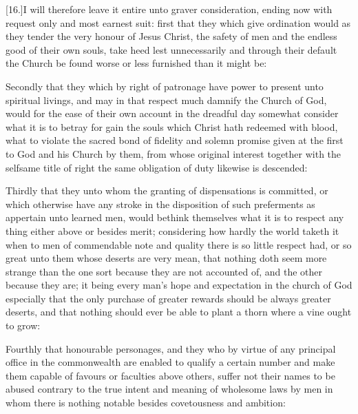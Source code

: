 [16.]I will therefore leave it entire unto graver consideration, ending now with request only and most earnest suit: first that they which give ordination would as they tender the very honour of Jesus Christ, the safety of men and the endless good of their own souls, take heed lest unnecessarily and through their default the Church be found worse or less furnished than it might be:

Secondly that they which by right of patronage have power to present unto spiritual livings, and may in that respect much damnify the Church of God, would for the ease of their own account in the dreadful day somewhat consider what it is to betray for gain the souls which Christ hath redeemed with blood, what to violate the sacred bond of fidelity and solemn promise given at the first to God and his Church by them, from whose original interest together with the selfsame title of right the same obligation of duty likewise is descended:

Thirdly that they unto whom the granting of dispensations is committed, or which otherwise have any stroke in the disposition of such preferments as appertain unto learned men, would bethink themselves what it is to respect any thing either above or besides merit; considering how hardly the world taketh it when to men of commendable note and quality there is so little respect had, or so great unto them whose deserts are very mean, that nothing doth seem more strange than the one sort because they are not accounted of, and the other because they are; it being every man’s hope and expectation in the church of God especially that the only purchase of greater rewards should be always greater deserts, and that nothing should ever be able to plant a thorn where a vine ought to grow:

Fourthly that honourable personages, and they who by virtue of any principal office in the commonwealth are enabled to qualify a certain number and make them capable of favours  or faculties above others, suffer not their names to be abused contrary to the true intent and meaning of wholesome laws by men in whom there is nothing notable besides covetousness and ambition:

